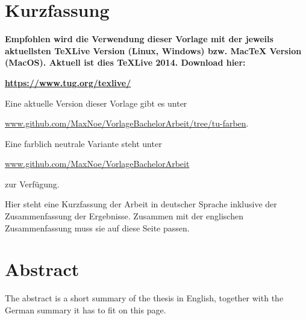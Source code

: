 \thispagestyle{plain}
\section*{Kurzfassung}

\textbf{\large Empfohlen wird die Verwendung dieser Vorlage mit der jeweils aktuellsten TeXLive Version (Linux, Windows) bzw. MacTeX Version (MacOS).
Aktuell ist dies TeXLive 2014. Download hier: }

\href{https://www.tug.org/texlive/}{\textbf{\large https://www.tug.org/texlive/}}

Eine aktuelle Version dieser Vorlage gibt es unter 

\href{https://github.com/MaxNoe/VorlageBachelorArbeit/tree/tu-farben}{www.github.com/MaxNoe/VorlageBachelorArbeit/tree/tu-farben}.

Eine farblich neutrale Variante steht unter  

\href{https://github.com/MaxNoe/VorlageBachelorArbeit}{www.github.com/MaxNoe/VorlageBachelorArbeit}

zur Verfügung.


Hier steht eine Kurzfassung der Arbeit in deutscher Sprache inklusive der Zusammenfassung der
Ergebnisse.
Zusammen mit der englischen Zusammenfassung muss sie auf diese Seite passen.

\section*{Abstract}

The abstract is a short summary of the thesis in English, together with the German summary it has to fit on this page.
